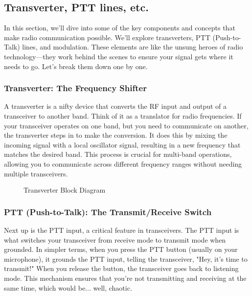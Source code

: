 \subsection{Transverter, PTT lines, etc.}
\label{subsec:transverter-ptt}

In this section, we'll dive into some of the key components and concepts that make radio communication possible. We'll explore transverters, PTT (Push-to-Talk) lines, and modulation. These elements are like the unsung heroes of radio technology—they work behind the scenes to ensure your signal gets where it needs to go. Let's break them down one by one.

\subsubsection*{Transverter: The Frequency Shifter}
A transverter is a nifty device that converts the RF input and output of a transceiver to another band. Think of it as a translator for radio frequencies. If your transceiver operates on one band, but you need to communicate on another, the transverter steps in to make the conversion. It does this by mixing the incoming signal with a local oscillator signal, resulting in a new frequency that matches the desired band. This process is crucial for multi-band operations, allowing you to communicate across different frequency ranges without needing multiple transceivers.

\begin{figure}[h!]
    \centering
    \caption{Transverter Block Diagram}
    \label{fig:transverter-diagram}
\end{figure}

\subsubsection*{PTT (Push-to-Talk): The Transmit/Receive Switch}
Next up is the PTT input, a critical feature in transceivers. The PTT input is what switches your transceiver from receive mode to transmit mode when grounded. In simpler terms, when you press the PTT button (usually on your microphone), it grounds the PTT input, telling the transceiver, "Hey, it's time to transmit!" When you release the button, the transceiver goes back to listening mode. This mechanism ensures that you're not transmitting and receiving at the same time, which would be... well, chaotic.

